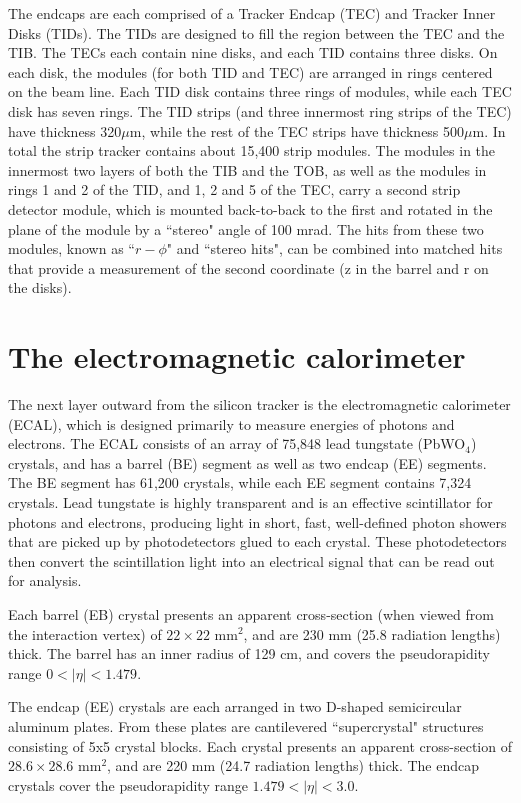 The endcaps are each comprised of a Tracker Endcap (TEC) and Tracker Inner Disks (TIDs). The TIDs are designed to fill the region between the TEC and the TIB. The TECs each contain nine disks, and each TID contains three disks. On each disk, the modules (for both TID and TEC) are arranged in rings centered on the beam line. Each TID disk contains three rings of modules, while each TEC disk has seven rings. The TID strips (and three innermost ring strips of the TEC) have thickness 320$\mu$m, while the rest of the TEC strips have thickness 500$\mu$m. In total the strip tracker contains about 15,400 strip modules. The modules in the innermost two layers of both the TIB and the TOB, as well as the modules in rings 1 and 2 of the TID, and 1, 2 and 5 of the TEC, carry a second strip detector module, which
is mounted back-to-back to the first and rotated in the plane of the module by a ``stereo" angle
of 100 mrad. The hits from these two modules, known as ``$r-\phi$" and ``stereo hits", can be combined
into matched hits that provide a measurement of the second coordinate (z in the barrel and r on
the disks).\cite{TrackReco}\cite{TDR}



\section{The electromagnetic calorimeter}

The next layer outward from the silicon tracker is the electromagnetic calorimeter (ECAL), which is designed primarily to measure energies of photons and electrons. The ECAL consists of an array of 75,848 lead tungstate (PbWO$_4$) crystals, and has a barrel (BE) segment as well as two endcap (EE) segments. The BE segment has 61,200 crystals, while each EE segment contains 7,324 crystals. Lead tungstate is highly transparent and is an effective scintillator for photons and electrons, producing light in short, fast, well-defined photon showers that are picked up by photodetectors glued to each crystal. These photodetectors then convert the scintillation light into an electrical signal that can be read out for analysis. 

Each barrel (EB) crystal presents an apparent cross-section (when viewed from the interaction vertex) of $22\times22$ mm$^2$, and are 230 mm (25.8 radiation lengths) thick. The barrel has an inner radius of 129 cm, and covers the pseudorapidity range $0 < |\eta| < 1.479$.\cite{TDR}

The endcap (EE) crystals are each arranged in two D-shaped semicircular aluminum plates. From these plates are cantilevered ``supercrystal" structures consisting of 5x5 crystal blocks. Each crystal presents an apparent cross-section of $28.6\times28.6$ mm$^2$, and are 220 mm (24.7 radiation lengths) thick. The endcap crystals cover the pseudorapidity range $1.479 < |\eta| < 3.0$.\cite{ECAL}

